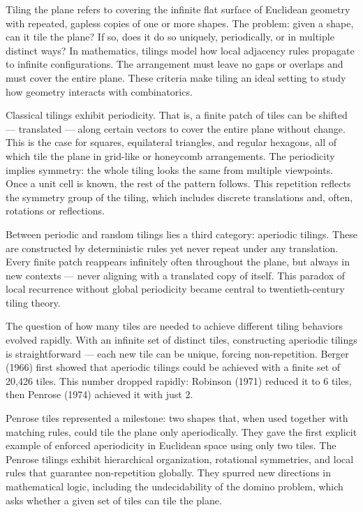 Tiling the plane refers to covering the infinite flat surface of Euclidean geometry with repeated, gapless copies of one or more shapes. The problem: given a shape, can it tile the plane? If so, does it do so uniquely, periodically, or in multiple distinct ways? In mathematics, tilings model how local adjacency rules propagate to infinite configurations. The arrangement must leave no gaps or overlaps and must cover the entire plane. These criteria make tiling an ideal setting to study how geometry interacts with combinatorics.

Classical tilings exhibit periodicity. That is, a finite patch of tiles can be shifted — translated — along certain vectors to cover the entire plane without change. This is the case for squares, equilateral triangles, and regular hexagons, all of which tile the plane in grid-like or honeycomb arrangements. The periodicity implies symmetry: the whole tiling looks the same from multiple viewpoints. Once a unit cell is known, the rest of the pattern follows. This repetition reflects the symmetry group of the tiling, which includes discrete translations and, often, rotations or reflections.

Between periodic and random tilings lies a third category: aperiodic tilings. These are constructed by deterministic rules yet never repeat under any translation. Every finite patch reappears infinitely often throughout the plane, but always in new contexts — never aligning with a translated copy of itself. This paradox of local recurrence without global periodicity became central to twentieth-century tiling theory.

The question of how many tiles are needed to achieve different tiling behaviors evolved rapidly. With an infinite set of distinct tiles, constructing aperiodic tilings is straightforward — each new tile can be unique, forcing non-repetition. Berger (1966) first showed that aperiodic tilings could be achieved with a finite set of 20,426 tiles. This number dropped rapidly: Robinson (1971) reduced it to 6 tiles, then Penrose (1974) achieved it with just 2.

Penrose tiles represented a milestone: two shapes that, when used together with matching rules, could tile the plane only aperiodically. They gave the first explicit example of enforced aperiodicity in Euclidean space using only two tiles. The Penrose tilings exhibit hierarchical organization, rotational symmetries, and local rules that guarantee non-repetition globally. They spurred new directions in mathematical logic, including the undecidability of the domino problem, which asks whether a given set of tiles can tile the plane.

